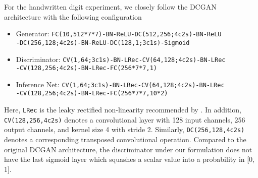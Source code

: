 \documentclass[a4paper]{article}
\begin{document}
For the handwritten digit experiment, we closely follow the DCGAN~\citep{radford2015unsupervised} architecture with the following configuration
{\footnotesize
\begin{itemize}[leftmargin=16pt,labelindent=16pt]
\item Generator: \texttt{FC(10,512*7*7)-BN-ReLU-DC(512,256;4c2s)-BN-ReLU}\\ 
\texttt{-DC(256,128;4c2s)-BN-ReLU-DC(128,1;3c1s)-Sigmoid}
\item Discriminator: \texttt{CV(1,64;3c1s)-BN-LRec-CV(64,128;4c2s)-BN-LRec}\\ 
\texttt{-CV(128,256;4c2s)-BN-LRec-FC(256*7*7,1)}
\item Inference Net: \texttt{CV(1,64;3c1s)-BN-LRec-CV(64,128;4c2s)-BN-LRec}\\ 
\texttt{-CV(128,256;4c2s)-BN-LRec-FC(256*7*7,10*2)}
\end{itemize}}
Here, \texttt{LRec} is the leaky rectified non-linearity recommended by \citet{radford2015unsupervised}. 
In addition, \texttt{CV(128,256,4c2s)} denotes a convolutional layer with 128 input channels, 256 output channels, and kernel size 4 with stride 2. Similarly, \texttt{DC(256,128,4c2s)} denotes a corresponding transposed convolutional operation. 
Compared to the original DCGAN architecture, the discriminator under our formulation does not have the last sigmoid layer which squashes a scalar value into a probability in [0, 1]. 
\end{document}
